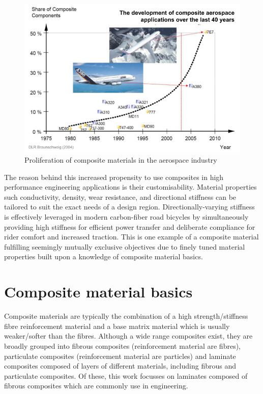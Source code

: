 \begin{figure}[H]
	\centering
	\def\svgwidth{\columnwidth}
	\includegraphics[width=12cm]{images/composites_aerospace.png}
	\caption{Proliferation of composite materials in the aerospace industry \cite{BischLitBook04}}
	\label{composite_aerospace}
\end{figure}

The reason behind this increased propensity to use composites in high performance engineering applications is their customisability. Material properties such conductivity, density, wear resistance, and directional stiffness can be tailored to suit the exact needs of a design region. Directionally-varying stiffness is effectively leveraged in modern carbon-fiber road bicycles by simultaneously providing high stiffness for efficient power transfer and deliberate compliance for rider comfort and increased traction. This is one example of a composite material fulfilling seemingly mutually exclusive objectives due to finely tuned material properties built upon a knowledge of composite material basics.

\section{Composite material basics}

Composite materials are typically the combination of a high strength/stiffness fibre reinforcement material and a base matrix material which is usually weaker/softer than the fibres. Although a wide range composites exist, they are broadly grouped into fibrous composites (reinforcement material are fibres), particulate composites (reinforcement material are particles) and laminate composites composed of layers of different materials, including fibrous and particulate composites. Of these, this work focusses on laminates composed of fibrous composites which are commonly use in engineering.

